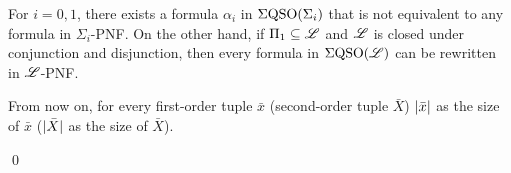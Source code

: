 \begin{thm}\label{theo-pi1-pnf}
For $i = 0,1$, there exists a formula $\alpha_i$ in $\Sigma{\rm QSO}(\Sigma_{i})$ that is not equivalent to any formula in $\Sigma_i$-PNF. 
On the other hand, if $\Pi_{1} \subseteq \mathscr{L}$ and $\mathscr{L}$ is closed under conjunction and disjunction, then every formula in $\Sigma{\rm QSO}(\mathscr{L})$ can be rewritten in $\mathscr{L}$-PNF. 

From now on, for every first-order tuple $\bar{x}$ (second-order tuple $\bar{X}$) $\vert \bar{x} \vert$ as the size of $\bar{x}$ ($\vert \bar{X} \vert$ as the size of $\bar{X}$).
\end{thm}
\proof

\qed

\begin{figure*}
\begin{center}
\end{center}
\end{figure*}

